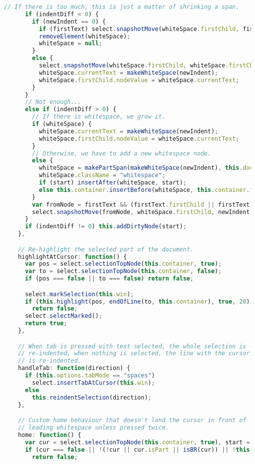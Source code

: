 \begin{lstlisting}[language=Javascript]
      // If there is too much, this is just a matter of shrinking a span.
      if (indentDiff < 0) {
        if (newIndent == 0) {
          if (firstText) select.snapshotMove(whiteSpace.firstChild, firstText.firstChild, 0);
          removeElement(whiteSpace);
          whiteSpace = null;
        }
        else {
          select.snapshotMove(whiteSpace.firstChild, whiteSpace.firstChild, indentDiff, true);
          whiteSpace.currentText = makeWhiteSpace(newIndent);
          whiteSpace.firstChild.nodeValue = whiteSpace.currentText;
        }
      }
      // Not enough...
      else if (indentDiff > 0) {
        // If there is whitespace, we grow it.
        if (whiteSpace) {
          whiteSpace.currentText = makeWhiteSpace(newIndent);
          whiteSpace.firstChild.nodeValue = whiteSpace.currentText;
        }
        // Otherwise, we have to add a new whitespace node.
        else {
          whiteSpace = makePartSpan(makeWhiteSpace(newIndent), this.doc);
          whiteSpace.className = "whitespace";
          if (start) insertAfter(whiteSpace, start);
          else this.container.insertBefore(whiteSpace, this.container.firstChild);
        }
        var fromNode = firstText && (firstText.firstChild || firstText);
        select.snapshotMove(fromNode, whiteSpace.firstChild, newIndent, false, true);
      }
      if (indentDiff != 0) this.addDirtyNode(start);
    },

    // Re-highlight the selected part of the document.
    highlightAtCursor: function() {
      var pos = select.selectionTopNode(this.container, true);
      var to = select.selectionTopNode(this.container, false);
      if (pos === false || to === false) return false;

      select.markSelection(this.win);
      if (this.highlight(pos, endOfLine(to, this.container), true, 20) === false)
        return false;
      select.selectMarked();
      return true;
    },

    // When tab is pressed with text selected, the whole selection is
    // re-indented, when nothing is selected, the line with the cursor
    // is re-indented.
    handleTab: function(direction) {
      if (this.options.tabMode == "spaces")
        select.insertTabAtCursor(this.win);
      else
        this.reindentSelection(direction);
    },

    // Custom home behaviour that doesn't land the cursor in front of
    // leading whitespace unless pressed twice.
    home: function() {
      var cur = select.selectionTopNode(this.container, true), start = cur;
      if (cur === false || !(!cur || cur.isPart || isBR(cur)) || !this.container.firstChild)
        return false;


\end{lstlisting}
